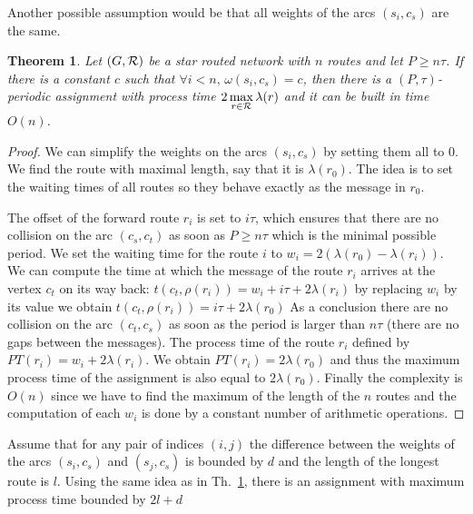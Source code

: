 \documentclass[10pt, conference, letterpaper]{IEEEtran}
\newtheorem{theorem}{Theorem}
\begin{document}
	Another possible assumption would be that all weights of the arcs $(s_i,c_s)$ are the same.
	
	 \begin{theorem}\label{th:asym}
	 Let $(G,{\cal R})$ be a star routed network with $n$ routes and let $P \geq n\tau$. If there is a constant $c$ such that $\forall i < n, \,\omega(s_i,c_s) = c$, then there is a $(P,\tau)$-periodic assignment with process time $2\, \displaystyle{\max_{r\in {\cal R}} \lambda(r)}$ and it can be built in time $O(n)$.
	 \end{theorem}
      \begin{proof}
      
        We can simplify the weights on the arcs $(s_i,c_s)$ by setting them all to $0$.
        We find the route with maximal length, say that it is $\lambda(r_0)$. The idea is to 
        set the waiting times of all routes so they behave exactly as the message in $r_0$.
        
        The offset of the forward route $r_i$ is set to $i\tau$, which ensures that there are no collision on the arc $(c_s,c_t)$ as soon as $P \geq n\tau$ which is the minimal possible period. We set the waiting time for the route $i$ to $w_i = 2(\lambda(r_{0}) - \lambda(r_{i}))$. We can compute the time at which the message of the route $r_i$ arrives at the vertex $c_t$ on its way back: $t(c_t,\rho(r_i)) = w_i + i\tau + 2\lambda(r_{i})$
        by replacing $w_i$ by its value we obtain $t(c_t,\rho(r_i)) =  i\tau + 2\lambda(r_{0})$
        As a conclusion there are no collision on the arc $(c_t,c_s)$ as soon as the 
        period is larger than $n\tau$ (there are no gaps between the messages).
        The process time of the route $r_i$ defined by $PT(r_i) = w_i + 2\lambda(r_{i}) $. We obtain $PT(r_i) = 2\lambda(r_{0})$ and thus the maximum process time of the assignment is also equal to $2\lambda(r_0)$.
Finally the complexity is $O(n)$ since we have to find the maximum of the length of the $n$ routes and the computation of each $w_i$ is done by a constant number of arithmetic operations.
     \end{proof}
     
     Assume that for any pair of indices $(i,j)$ the difference between the weights of the arcs $(s_i,c_s)$ and $(s_j,c_s)$ is bounded by $d$ and the length of the longest route is $l$. Using the same idea as in Th.~\ref{th:asym}, there is an assignment with maximum process time bounded by  $2l + d$
     
\end{document}
